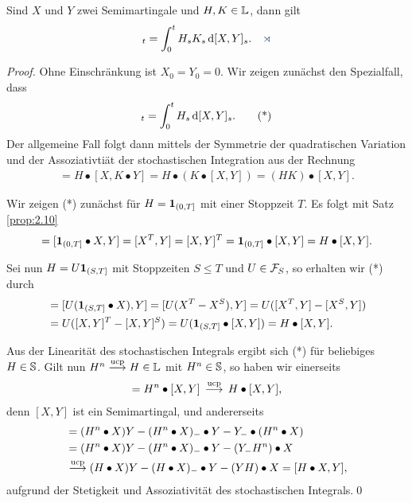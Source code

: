 \begin{theorem}
\label{prop:2.19}
Sind $X$ und $Y$ zwei Semimartingale und $H,K\in\L$, dann gilt
\begin{align*}
[H \bullet X, K \bullet Y]_t = \int_0^t H_sK_s \,\diffd[X,Y]_s.\fish
\end{align*}
\end{theorem}
\begin{proof}
Ohne Einschränkung ist $X_0 = Y_0 = 0$. Wir zeigen zunächst den Spezialfall,
dass
\begin{align*}
[H\bullet X,Y]_t = \int_0^t H_s \,\diffd[X,Y]_s.\tag{*}
\end{align*}
Der allgemeine Fall folgt dann mittels der Symmetrie der quadratischen Variation
und der Assoziativtiät der stochastischen Integration aus der Rechnung
\begin{align*}
[H\bullet X,K\bullet Y] = H\bullet [X,K\bullet Y]
= H\bullet (K\bullet [X,Y]) = (HK)\bullet [X,Y].
\end{align*}

Wir zeigen (*) zunächst für $H=\Id_{(0,T]}$ mit einer Stoppzeit
$T$. Es folgt mit Satz \ref{prop:2.10}
\begin{align*}
[H\bullet X,Y] = [\Id_{(0,T]}\bullet X,Y] = [X^T,Y] = [X,Y]^T = 
\Id_{(0,T]}\bullet [X,Y] = H\bullet [X,Y]. 
\end{align*}

Sei nun $H=U\Id_{(S,T]}$ mit Stoppzeiten $S\le T$ und $U\in\FF_S$, so erhalten
wir (*) durch
\begin{align*}
[H\bullet X,Y] &= [ U(\Id_{(S,T]}\bullet X),Y] = [U(X^T-X^S),Y]
= U([X^T,Y]-[X^S,Y])\\
&= U([X,Y]^T-[X,Y]^S)
= U(\Id_{(S,T]}\bullet [X,Y])
= H\bullet [X,Y].
\end{align*}

Aus der Linearität des stochastischen Integrals ergibt sich (*) für beliebiges
$H\in\S$. Gilt nun $H^n\ucpto H\in\L$ mit $H^n\in\S$, so haben wir einerseits
\begin{align*}
[H^n\bullet X,Y] = H^n\bullet[X,Y]\,\ucpto\, H\bullet[X,Y],
\end{align*}
denn $[X,Y]$ ist ein Semimartingal, und andererseits
\begin{align*}
[H^n\bullet X,Y] &= (H^n\bullet X) Y - (H^n\bullet X)_-\bullet Y - Y_-\bullet
(H^n\bullet X) \\
&= (H^n\bullet X) Y - (H^n\bullet X)_-\bullet Y -
(Y_-H^n)\bullet X\\
&\ucpto (H\bullet X)Y - (H\bullet X)_-\bullet Y -
(YH)\bullet X = [H\bullet X,Y],
\end{align*}
aufgrund der Stetigkeit und Assoziativität des stochastischen Integrals.\qed
\end{proof}

